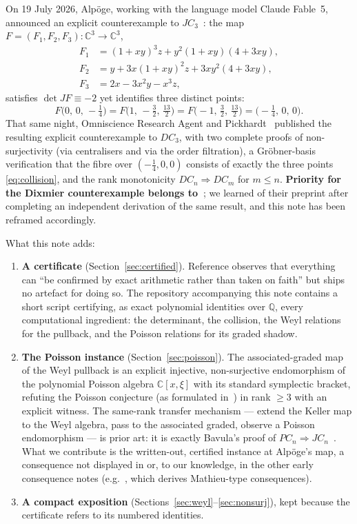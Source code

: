 \documentclass[11pt]{article}
\theoremstyle{remark}
\newcommand{\C}{\mathbb{C}}
\newcommand{\Q}{\mathbb{Q}}
\begin{document}
On 19 July 2026, Alp\"oge, working with the language model Claude Fable~5,
announced an explicit counterexample to $JC_3$~\cite{Alpoge2026}: the map
$F=(F_1,F_2,F_3)\colon\C^3\to\C^3$,
\begin{equation}\label{eq:F}
\begin{aligned}
F_1 &= (1+xy)^3 z + y^2(1+xy)(4+3xy),\\
F_2 &= y + 3x(1+xy)^2 z + 3xy^2(4+3xy),\\
F_3 &= 2x - 3x^2y - x^3 z,
\end{aligned}
\end{equation}
satisfies $\det JF \equiv -2$ yet identifies three distinct points:
\begin{equation}\label{eq:collision}
F\bigl(0,\,0,\,-\tfrac14\bigr)
= F\bigl(1,\,-\tfrac32,\,\tfrac{13}{2}\bigr)
= F\bigl(-1,\,\tfrac32,\,\tfrac{13}{2}\bigr)
= \bigl(-\tfrac14,\,0,\,0\bigr).
\end{equation}
That same night, Omniscience Research Agent and Pickhardt~\cite{OP2026}
published the resulting explicit counterexample to $DC_3$, with two
complete proofs of non-surjectivity (via centralisers and via the order
filtration), a Gr\"obner-basis verification that the fibre over
$(-\tfrac14,0,0)$ consists of exactly the three points
\eqref{eq:collision}, and the rank monotonicity $DC_n\Rightarrow DC_m$ for
$m\le n$. \textbf{Priority for the Dixmier counterexample belongs
to~\cite{OP2026}}; we learned of their preprint after completing an
independent derivation of the same result, and this note has been reframed
accordingly.

What this note adds:
\begin{enumerate}
\item \textbf{A certificate} (Section~\ref{sec:certified}). Reference
\cite{OP2026} observes that everything can ``be confirmed by exact
arithmetic rather than taken on faith'' but ships no artefact for doing so.
The repository accompanying this note contains a short script certifying,
as exact polynomial identities over $\Q$, every computational ingredient:
the determinant, the collision, the Weyl relations for the pullback, and
the Poisson relations for its graded shadow.
\item \textbf{The Poisson instance} (Section~\ref{sec:poisson}). The
associated-graded map of the Weyl pullback is an explicit injective,
non-surjective endomorphism of the polynomial Poisson algebra
$\C[x,\xi]$ with its standard symplectic bracket, refuting the Poisson
conjecture (as formulated in~\cite{AvdE2007}) in rank $\ge3$ with an
explicit witness. The same-rank transfer mechanism --- extend the Keller
map to the Weyl algebra, pass to the associated graded, observe a Poisson
endomorphism --- is prior art: it is exactly Bavula's proof of
$PC_n\Rightarrow JC_n$~\cite[Thm.~7]{Bavula2024}. What we contribute is
the written-out, certified instance at Alp\"oge's map, a consequence not
displayed in \cite{OP2026} or, to our knowledge, in the other early
consequence notes (e.g.~\cite{Zhang2026}, which derives Mathieu-type
consequences).
\item \textbf{A compact exposition} (Sections~\ref{sec:weyl}--\ref{sec:nonsurj}),
kept because the certificate refers to its numbered identities.
\end{enumerate}
\end{document}

